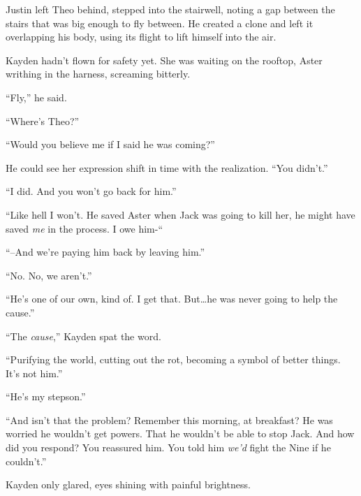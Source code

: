 Justin left Theo behind, stepped into the stairwell, noting a gap between the stairs that was big enough to fly between.  He created a clone and left it overlapping his body, using its flight to lift himself into the air.



Kayden hadn't flown for safety yet.  She was waiting on the rooftop, Aster writhing in the harness, screaming bitterly.



``Fly,'' he said.



``Where's Theo?''



``Would you believe me if I said he was coming?''



He could see her expression shift in time with the realization.  ``You didn't.''



``I did.  And you won't go back for him.''



``Like hell I won't.  He saved Aster when Jack was going to kill her, he might have saved \emph{me} in the process.  I owe him-``



``--And we're paying him back by leaving him.''



``No.  No, we aren't.''



``He's one of our own, kind of.  I get that.  But\ldots he was never going to help the cause.''



``The \emph{cause},'' Kayden spat the word.



``Purifying the world, cutting out the rot, becoming a symbol of better things.  It's not him.''



``He's my stepson.''



``And isn't that the problem?  Remember this morning, at breakfast?  He was worried he wouldn't get powers.  That he wouldn't be able to stop Jack.  And how did you respond?  You reassured him.  You told him \emph{we'd} fight the Nine if he couldn't.''



Kayden only glared, eyes shining with painful brightness.



